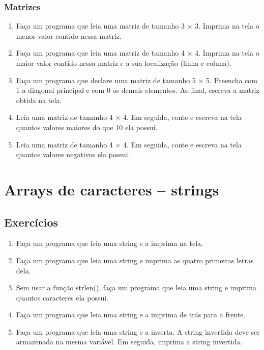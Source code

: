 \documentclass[a4paper,12pt]{article}
\begin{document}
\subsubsection{Matrizes}

\begin{enumerate}
  \item Faça um programa que leia uma matriz de tamanho 3 $\times$ 3. Imprima na tela o menor valor contido nessa matriz.
  \item Faça um programa que leia uma matriz de tamanho 4 $\times$ 4. Imprima na tela o maior valor contido nessa matriz e a sua localização (linha e coluna).
  \item Faça um programa que declare uma matriz de tamanho 5 $\times$ 5. Preencha com 1 a diagonal principal e com 0 os demais elementos. Ao final, escreva a matriz obtida na tela.
  \item Leia uma matriz de tamanho 4 $\times$ 4. Em seguida, conte e escreva na tela quantos valores maiores do que 10 ela possui.
  \item Leia uma matriz de tamanho 4 $\times$ 4. Em seguida, conte e escreva na tela quantos valores negativos ela possui.
\end{enumerate}

\pagebreak
\section{Arrays de caracteres – strings}

\subsection{Exercícios}

\begin{enumerate}
  \item Faça um programa que leia uma string e a imprima na tela.
  \item Faça um programa que leia uma string e imprima as quatro primeiras letras dela.
  \item Sem usar a função strlen(), faça um programa que leia uma string e imprima quantos caracteres ela possui.
  \item Faça um programa que leia uma string e a imprima de trás para a frente.
  \item Faça um programa que leia uma string e a inverta. A string invertida deve ser armazenada na mesma variável. Em seguida, imprima a string invertida.
\end{enumerate}
\end{document}
